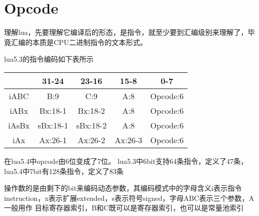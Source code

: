 \chapter{Opcode}


理解lua，先要理解它编译后的形态，是指令，就至少要到汇编级别来理解了，毕竟汇编的本质是CPU二进制指令的文本形式。

lua5.3的指令编码如下表所示
\begin{center}
    \begin{tabular}{|c|c|c|c|c|} \hline
       \hbox{} & \hbox{31-24} & \hbox{23-16} & \hbox{15-8} & \hbox{0-7} \\ \hline
       \hbox{iABC} & \hbox{B:9} & \hbox{C:9} & \hbox{A:8}  & \hbox{Opcode:6} \\ \hline
       \hbox{iABx} & \hbox{Bx:18-1} & \hbox{Bx:18-2} & \hbox{A:8}  & \hbox{Opcode:6} \\ \hline
       \hbox{iAsBx} & \hbox{sBx:18-1} & \hbox{sBx:18-2} & \hbox{A:8}  & \hbox{Opcode:6} \\ \hline
       \hbox{iAx} & \hbox{Ax:26-1} & \hbox{Ax:26-2} & \hbox{Ax:26-3}  & \hbox{Opcode:6} \\ \hline
    \end{tabular}
\end{center}
在lua5.4中opcode由6位变成了7位。
lua5.3中6bit支持64条指令，定义了47条，lua5.4中7bit有128条指令，定义了83条

操作数的是由剩下的bit来编码动态参数，其编码模式中的字母含义i表示指令instruction，x表示扩展extended，s表示符号signed，字母ABC表示三个参数，A一般用作
目标寄存器索引，B和C既可以是寄存器索引，也可以是常量池索引

